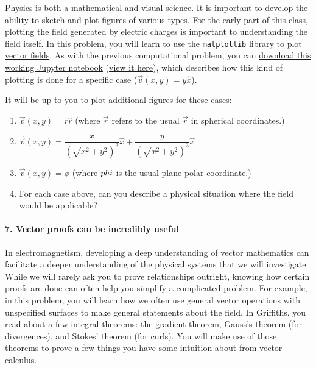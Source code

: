 \documentclass[11pt]{article}
\def\tightlist{}
\begin{document}
Physics is both a mathematical and visual science. It is important to
develop the ability to sketch and plot figures of various types. For the
early part of this class, plotting the field generated by electric
charges is important to understanding the field itself. In this problem,
you will learn to use the
\href{http://matplotlib.org}{\texttt{matplotlib} library} to
\href{http://matplotlib.org/examples/pylab_examples/quiver_demo.html}{plot
vector fields}. As with the previous computational problem, you can
\href{../jupyter/HW1-VectorFieldsProblem.ipynb}{download this working
Jupyter notebook}
(\href{https://github.com/dannycab/phy481msu/blob/gh-pages/jupyter/HW1-VectorFieldsProblem.ipynb}{view
it here}), which describes how this kind of plotting is done for a
specific case (\(\vec{v}(x,y)=y\hat{x}\)).

It will be up to you to plot additional figures for these cases:

\begin{enumerate}
\def\labelenumi{\arabic{enumi}.}
\tightlist
\item
  \(\vec{v}(x,y)=r\hat{r}\) (where \(\vec{r}\) refers to the usual
  \(\vec{r}\) in spherical coordinates.)
\item
  \(\vec{v}(x,y) = \dfrac{x}{(\sqrt{x^2+y^2})^3}\hat{x}+\dfrac{y}{(\sqrt{x^2+y^2})^3}\hat{x}\)
\item
  \(\vec{v}(x,y) = \hat{\phi}\) (where \(\\phi\) is the usual
  plane-polar coordinate.)
\item
  For each case above, can you describe a physical situation where the
  field would be applicable?
\end{enumerate}

\paragraph{7. Vector proofs can be incredibly
useful}\label{vector-proofs-can-be-incredibly-useful}

In electromagnetism, developing a deep understanding of vector
mathematics can facilitate a deeper understanding of the physical
systems that we will investigate. While we will rarely ask you to prove
relationships outright, knowing how certain proofs are done can often
help you simplify a complicated problem. For example, in this problem,
you will learn how we often use general vector operations with
unspecified surfaces to make general statements about the field. In
Griffiths, you read about a few integral theorems: the gradient theorem,
Gauss's theorem (for divergences), and Stokes' theorem (for curls). You
will make use of those theorems to prove a few things you have some
intuition about from vector calculus.
\end{document}
